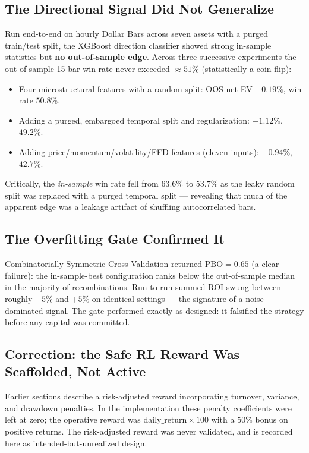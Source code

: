 \documentclass[12pt, a4paper]{article}
\begin{document}
\subsection{The Directional Signal Did Not Generalize}
Run end-to-end on hourly Dollar Bars across seven assets with a purged train/test split, the XGBoost direction classifier showed strong in-sample statistics but \textbf{no out-of-sample edge}. Across three successive experiments the out-of-sample 15-bar win rate never exceeded $\approx 51\%$ (statistically a coin flip):
\begin{itemize}
    \item Four microstructural features with a random split: OOS net EV $-0.19\%$, win rate $50.8\%$.
    \item Adding a purged, embargoed temporal split and regularization: $-1.12\%$, $49.2\%$.
    \item Adding price/momentum/volatility/FFD features (eleven inputs): $-0.94\%$, $42.7\%$.
\end{itemize}
Critically, the \emph{in-sample} win rate fell from $63.6\%$ to $53.7\%$ as the leaky random split was replaced with a purged temporal split --- revealing that much of the apparent edge was a leakage artifact of shuffling autocorrelated bars.

\subsection{The Overfitting Gate Confirmed It}
Combinatorially Symmetric Cross-Validation returned $\text{PBO} = 0.65$ (a clear failure): the in-sample-best configuration ranks below the out-of-sample median in the majority of recombinations. Run-to-run summed ROI swung between roughly $-5\%$ and $+5\%$ on identical settings --- the signature of a noise-dominated signal. The gate performed exactly as designed: it falsified the strategy before any capital was committed.

\subsection{Correction: the Safe RL Reward Was Scaffolded, Not Active}
Earlier sections describe a risk-adjusted reward incorporating turnover, variance, and drawdown penalties. In the implementation these penalty coefficients were left at zero; the operative reward was $\text{daily\_return} \times 100$ with a $50\%$ bonus on positive returns. The risk-adjusted reward was never validated, and is recorded here as intended-but-unrealized design.
\end{document}
